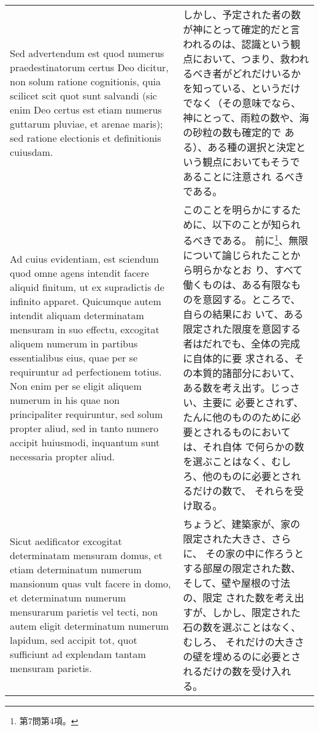\documentclass[10pt]{jsarticle} %
\begin{document}
\begin{longtable}{p{21em}p{21em}}
Sed advertendum est quod numerus
praedestinatorum certus Deo dicitur, non solum ratione cognitionis, quia
scilicet scit quot sunt salvandi (sic enim Deo certus est etiam numerus
guttarum pluviae, et arenae maris); sed ratione electionis et
definitionis cuiusdam. 


&

しかし、予定された者の数が神にとって確定的だと言われるのは、認識という観
 点において、つまり、救われるべき者がどれだけいるかを知っている、というだけ
 でなく（その意味でなら、神にとって、雨粒の数や、海の砂粒の数も確定的で
 ある）、ある種の選択と決定という観点においてもそうであることに注意され
 るべきである。

\\


Ad cuius evidentiam, est sciendum quod omne agens
intendit facere aliquid finitum, ut ex supradictis de infinito
apparet. Quicumque autem intendit aliquam determinatam mensuram in suo
effectu, excogitat aliquem numerum in partibus essentialibus eius, quae
per se requiruntur ad perfectionem totius. Non enim per se eligit
aliquem numerum in his quae non principaliter requiruntur, sed solum
propter aliud, sed in tanto numero accipit huiusmodi, inquantum sunt
necessaria propter aliud. 


&

このことを明らかにするために、以下のことが知られるべきである。
前に\footnote{第7問第4項。}、無限について論じられたことから明らかなとお
 り、すべて働くものは、ある有限なものを意図する。ところで、自らの結果にお
 いて、ある限定された限度を意図する者はだれでも、全体の完成に自体的に要
 求される、その本質的諸部分において、ある数を考え出す。じっさい、主要に
 必要とされず、たんに他のもののために必要とされるものにおいては、それ自体
 で何らかの数を選ぶことはなく、むしろ、他のものに必要とされるだけの数で、
 それらを受け取る。

\\


Sicut aedificator excogitat determinatam
mensuram domus, et etiam determinatum numerum mansionum quas vult facere
in domo, et determinatum numerum mensurarum parietis vel tecti, non
autem eligit determinatum numerum lapidum, sed accipit tot, quot
sufficiunt ad explendam tantam mensuram parietis. 


&

ちょうど、建築家が、家の限定された大きさ、さらに、
 その家の中に作ろうとする部屋の限定された数、そして、壁や屋根の寸法の、限定
 された数を考え出すが、しかし、限定された石の数を選ぶことはなく、むしろ、
それだけの大きさの壁を埋めるのに必要とされるだけの数を受け入れる。


\end{longtable}
\end{document}
